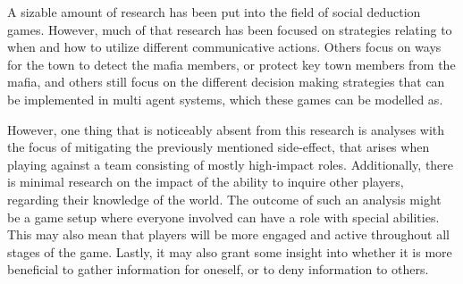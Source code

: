 A sizable amount of research has been put into the field of social deduction
games. However, much of that research has been focused on strategies relating
to when and how to utilize different communicative actions\cite{commitment}.
Others focus on ways for the town to detect the mafia
members\cite{werewolf_stealth}, or protect key town members from the
mafia\cite{werewolf_nash_equilibrium}, and others still focus on the different
decision making strategies that can be implemented in multi agent systems,
which these games can be modelled
as\cite{modelling_multi_agent_epistemic_systems}\cite{multi_agent_epistemic_planner_common_knowledge}\cite{probibalistic_multiagent_systems}.

However, one thing that is noticeably absent from this research is analyses
with the focus of mitigating the previously mentioned side-effect, that arises
when playing against a team consisting of mostly high-impact roles.
Additionally, there is minimal research on the impact of the ability to inquire
other players, regarding their knowledge of the world. The outcome of such an
analysis might be a game setup where everyone involved can have a role with
special abilities. This may also mean that players will be more engaged and
active throughout all stages of the game. Lastly, it may also grant some
insight into whether it is more beneficial to gather information for oneself,
or to deny information to others.